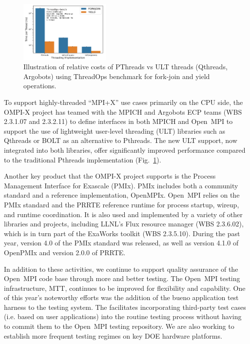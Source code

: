 \begin{figure}
    \includegraphics[width=0.40\textwidth]{projects/2.3.1-PMR/2.3.1.17-OMPI-X/ult-performance.png}
    \caption{Illustration of relative costs of PThreads vs ULT threads (Qthreads, Argobots) using ThreadOps benchmark for fork-join and yield operations.}
    \label{fig:ult-performance}
\end{figure}

To support highly-threaded ``MPI+X'' use cases primarily on the CPU side, the OMPI-X project has teamed with the MPICH and Argobots ECP teams (WBS 2.3.1.07 and 2.3.2.11)
to define interfaces in both MPICH and Open~MPI to support the use of lightweight user-level threading (ULT) libraries such as Qthreads or BOLT
as an alternative to Pthreads.  The new ULT support, now integrated into both libraries, offer significantly improved performance compared to 
the traditional Pthreads implementation (Fig.~\ref{fig:ult-performance}).

Another key product that the OMPI-X project supports is the Process Management Interface for Exascale (PMIx).  PMIx includes both a community standard
and a reference implementation, OpenMPIx.  Open~MPI relies on the PMIx standard and the PRRTE reference runtime for process startup, wireup, and runtime coordination.
It is also used and implemented by a variety of other libraries and projects, including LLNL's Flux resource manager (WBS 2.3.6.02), which is in turn part of the ExaWorks toolkit (WBS 2.3.5.10).
During the past year, version 4.0 of the PMIx standard was released, as well as version 4.1.0 of OpenPMIx and version 2.0.0 of PRRTE.

In addition to these activities, we continue to support quality assurance of the Open~MPI code base through more and better testing.  The Open~MPI testing infrastructure, 
MTT, continues to be improved for flexibility and capability.  One of this year's noteworthy efforts was the addition of the bueno application test harness to the testing 
system.  The facilitates incorporating third-party test cases (i.e. based on user applications) into the routine testing process without having to commit them to the
Open~MPI testing repository.  We are also working to establish more frequent testing regimes on key DOE hardware platforms.

